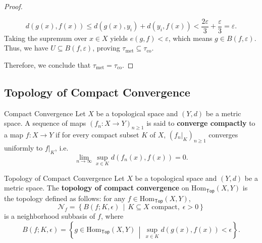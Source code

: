 \documentclass{report}
\newcommand{\midv}{\,\middle\vert\,}
\begin{document}
\begin{proof}
\begin{enumerate}[(i)]
		$$
		d(g(x), f(x)) \leq d\left(g(x), y_i\right)+d\left(y_i, f(x)\right)<\frac{2 \varepsilon}{3}+\frac{\varepsilon}{3}=\varepsilon .
		$$
        Taking the supremum over $x \in X$ yields $e(g,f)<\varepsilon$, which means $g \in B(f,\varepsilon)$. Thus, we have $U \subseteq B(f,\varepsilon)$, proving $\tau_{\mathrm{met}}\subseteq \tau_{\mathrm{co}}$.
	\end{enumerate}
	Therefore, we conclude that $\tau_{\mathrm{met}}=\tau_{\mathrm{co}}$.
\end{proof}

\subsection{Topology of Compact Convergence}


\begin{definition}{Compact Convergence}{}
	Let $X$ be a topological space and $(Y,d)$ be a metric space. A sequence of maps $\left(f_n:X\to Y\right)_{n \ge 1}$ is said to \textbf{converge compactly} to a map $f:X\to Y$ if for every compact subset $K$ of $X$, $\left(f_n|_K\right)_{n \ge 1}$ converges uniformly to $f|_K$, i.e.
	\[
	  \lim_{n\to \infty}\sup_{x\in K}d\left(f_n(x),f(x)\right)=0.
	\]
\end{definition}

\begin{definition}{Topology of Compact Convergence}{}
	Let $X$ be a topological space and $(Y,d)$ be a metric space. The \textbf{topology of compact convergence} on $\mathrm{Hom}_{\mathsf{Top}}(X,Y)$ is the topology defined as follows: for any $f\in \mathrm{Hom}_{\mathsf{Top}}(X,Y)$,
	 \[
	 \mathcal{N}_f=\left\{B(f;K,\epsilon)\midv K\subseteq X\text{ compact},\;\epsilon>0	\right\}
	 \]
	 is a neighborhood subbasis of $f$, where
	 \[
	 B(f;K,\epsilon)=\left\{g\in \mathrm{Hom}_{\mathsf{Top}}(X,Y)\midv \sup_{x\in K}d\left(g(x),f(x)\right)<\epsilon\right\}.
	 \]
\end{definition}
\end{document}
